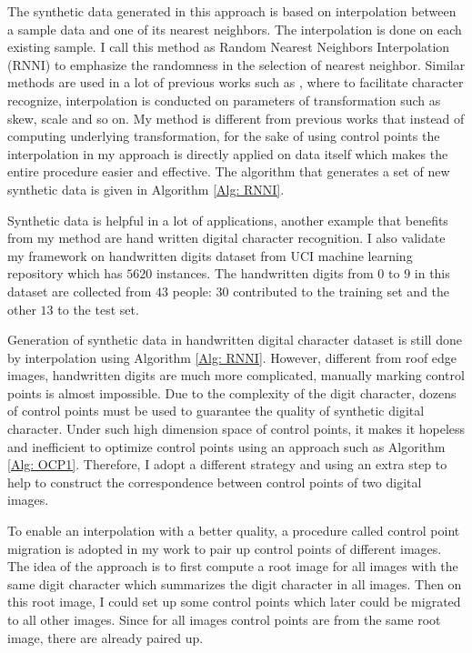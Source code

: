 \documentclass{iitthesis}
\begin{document}
The synthetic data generated in this approach is based on interpolation between a sample data and one of its nearest neighbors. The interpolation is done on each existing sample. I call this method as Random Nearest Neighbors Interpolation (RNNI) to emphasize the randomness in the selection of nearest neighbor. Similar methods are used in a lot of previous works such as \cite{Comput.Sci.&Appl.Math.1997}, where to facilitate character recognize, interpolation is conducted on parameters of transformation such as skew, scale and so on. My method is different from previous works that instead of computing underlying transformation, for the sake of using control points the interpolation in my approach is directly applied on data itself which makes the entire procedure easier and effective. The algorithm that generates a set of new synthetic data is given in Algorithm \ref{Alg: RNNI}.

 Synthetic data is helpful in a lot of applications, another example that benefits from my method are hand written digital character recognition. I also validate my framework on handwritten digits dataset from
UCI machine learning repository \cite{Bache+Lichman:2013} which has $5620$ instances. The handwritten digits from $0$ to $9$ in this dataset are collected from $43$ people: $30$ contributed to the training set and the other $13$ to the test set. 

Generation of synthetic data in handwritten digital character dataset is still done by interpolation using Algorithm \ref{Alg: RNNI}. However, different from roof edge images, handwritten digits are much more complicated, manually marking control points is almost impossible. Due to the complexity of the digit character, dozens of control points must be used to guarantee the quality of synthetic digital character. Under such high dimension space of control points, it makes it hopeless and inefficient to optimize control points using an approach such as Algorithm \ref{Alg: OCP1}. Therefore, I adopt a different strategy and using an extra step to help to construct the correspondence between control points of two digital images. 

To enable an interpolation with a better quality, a procedure called control point migration is adopted in my work to pair up control points of different images. The idea of the approach is to first compute a root image for all images with the same digit character which summarizes the digit character in all images. Then on this root image, I could set up some control points which later could be migrated to all other images. Since for all images control points are from the same root image, there are already paired up. 
\end{document}
